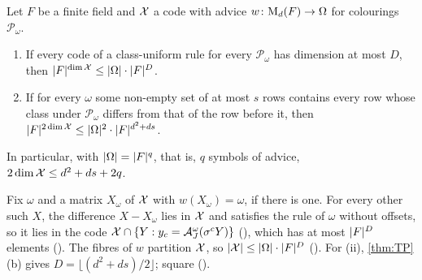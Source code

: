 \begin{theorem}\label{thm:any-advice}
Let $F$ be a finite field and $\mathcal{X}$ a code with advice $w\colon\mathrm{M}_d(F)\to\Omega$ for colourings $\mathcal P_\omega$.
\begin{enumerate}[label=(\roman*),leftmargin=2em]
\item If every code of a class-uniform rule for every $\mathcal P_\omega$ has dimension at most $D$, then
$\lvert F \rvert^{\dim\mathcal{X}}\le\lvert \Omega \rvert\cdot\lvert F \rvert^{D}$.
\item If for every $\omega$ some non-empty set of at most $s$ rows contains every row whose class under
$\mathcal P_\omega$ differs from that of the row before it, then $\lvert F \rvert^{2\dim\mathcal{X}}\le\lvert \Omega \rvert^2\cdot\lvert F \rvert^{d^2+ds}$.
\end{enumerate}
In particular, with $\lvert \Omega \rvert=\lvert F \rvert^q$, that is, $q$ symbols of advice, $2\dim\mathcal{X}\le d^2+ds+2q$.
\end{theorem}

\begin{outline}
Fix $\omega$ and a matrix $X_\omega$ of $\mathcal{X}$ with $w(X_\omega)=\omega$, if there is one. For every other such $X$, the
difference $X-X_\omega$ lies in $\mathcal{X}$ and satisfies the rule of $\omega$ without offsets, so it lies in the code
$\mathcal{X}\cap\{Y:y_c=\mathcal{A}^\omega_J(\sigma^cY)\}$ (), which has at most $\lvert F \rvert^D$ elements
(). The fibres of $w$ partition $\mathcal{X}$, so $\lvert \mathcal{X} \rvert\le\lvert \Omega \rvert\cdot\lvert F \rvert^D$
(). For (ii), \cref{thm:TP}(b) gives $D=\lfloor(d^2+ds)/2\rfloor$;
square ().
\end{outline}

